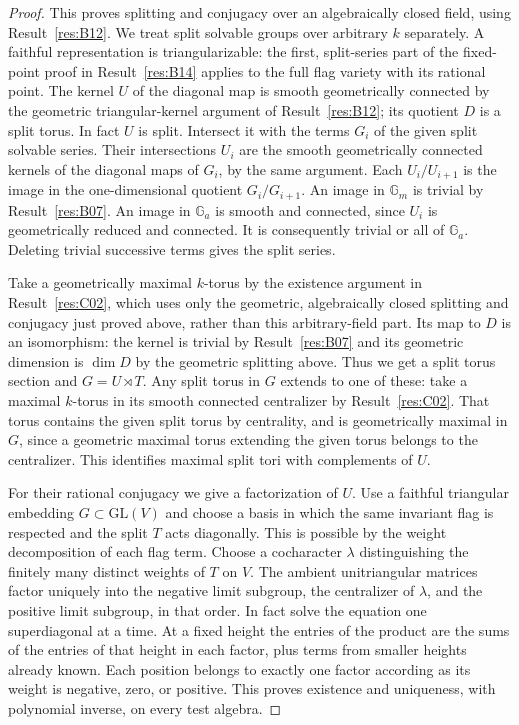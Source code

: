 \documentclass[11pt,a4paper,openany,oneside]{book}
\theoremstyle{resultstyle}
\theoremstyle{definition}
\numberwithin{equation}{chapter}
\newcommand{\Gm}{\mathbb{G}_m}
\newcommand{\Ga}{\mathbb{G}_a}
\newcommand{\GL}{\mathrm{GL}}
\begin{document}
\begin{proof}
This proves splitting and conjugacy over an algebraically closed
field, using Result~\ref{res:B12}. We treat split solvable groups
over arbitrary \(k\) separately. A faithful representation is
triangularizable: the first, split-series part of the fixed-point
proof in Result~\ref{res:B14} applies to the full flag variety with
its rational point. The kernel \(U\) of the diagonal map is smooth
geometrically connected by the geometric triangular-kernel
argument of Result~\ref{res:B12}; its quotient \(D\) is a split torus.
In fact \(U\) is split. Intersect it with the terms \(G_i\) of the
given split solvable series. Their intersections \(U_i\) are the
smooth geometrically connected kernels of the diagonal maps of
\(G_i\), by the same argument. Each \(U_i/U_{i+1}\) is the
image in the one-dimensional quotient \(G_i/G_{i+1}\).
An image in \(\Gm\) is trivial by Result~\ref{res:B07}.
An image in \(\Ga\) is smooth and connected, since \(U_i\)
is geometrically reduced and connected. It is consequently
trivial or all of \(\Ga\). Deleting trivial successive terms
gives the split series.

Take a geometrically maximal \(k\)-torus by the existence argument
in Result~\ref{res:C02}, which uses only the geometric, algebraically
closed splitting and conjugacy just proved above, rather than this
arbitrary-field part. Its map to \(D\) is an isomorphism: the kernel
is trivial by Result~\ref{res:B07} and its geometric dimension is
\(\dim D\) by the geometric splitting above. Thus we get a split
torus section and \(G=U\rtimes T\). Any split torus in \(G\)
extends to one of these: take a maximal \(k\)-torus in its smooth
connected centralizer by Result~\ref{res:C02}. That torus contains
the given split torus by centrality, and is geometrically maximal
in \(G\), since a geometric maximal torus extending the given
torus belongs to the centralizer. This identifies maximal split
tori with complements of \(U\).

For their rational conjugacy we give a factorization of \(U\).
Use a faithful triangular embedding \(G\subset\GL(V)\) and
choose a basis in which the same invariant flag is respected
and the split \(T\) acts diagonally. This is possible by
the weight decomposition of each flag term.
Choose a cocharacter \(\lambda\) distinguishing the finitely
many distinct weights of \(T\) on \(V\).
The ambient unitriangular matrices factor uniquely into
the negative limit subgroup, the centralizer of \(\lambda\),
and the positive limit subgroup, in that order.
In fact solve the equation one superdiagonal at a time.
At a fixed height the entries of the product are the sums
of the entries of that height in each factor, plus terms
from smaller heights already known. Each position belongs
to exactly one factor according as its weight is negative,
zero, or positive. This proves existence and uniqueness,
with polynomial inverse, on every test algebra.


\end{proof}
\end{document}
